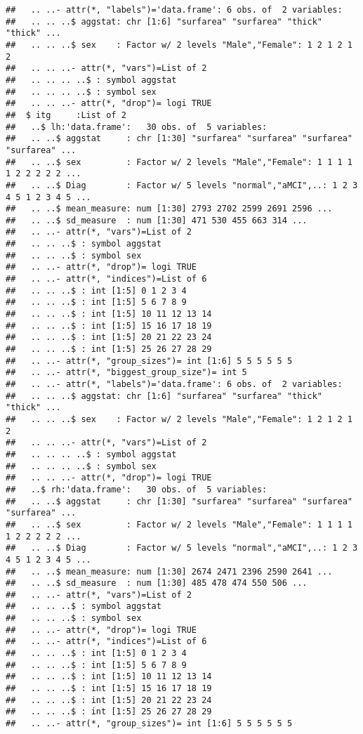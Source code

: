 \documentclass[12pt]{article}\usepackage[]{graphicx}\usepackage[]{color}
\makeatletter
\newenvironment{kframe}{%
 \def\at@end@of@kframe{}%
 \ifinner\ifhmode%
  \def\at@end@of@kframe{\end{minipage}}%
  \begin{minipage}{\columnwidth}%
 \fi\fi%
 \def\FrameCommand##1{\hskip\@totalleftmargin \hskip-\fboxsep
 \colorbox{shadecolor}{##1}\hskip-\fboxsep
     \hskip-\linewidth \hskip-\@totalleftmargin \hskip\columnwidth}%
 \MakeFramed {\advance\hsize-\width
   \@totalleftmargin\z@ \linewidth\hsize
   \@setminipage}}%
 {\par\unskip\endMakeFramed%
 \at@end@of@kframe}
\newenvironment{knitrout}{}{} %
\makeatother
\begin{document}
\begin{knitrout}
\begin{kframe}
\begin{verbatim}
##   .. ..- attr(*, "labels")='data.frame':	6 obs. of  2 variables:
##   .. .. ..$ aggstat: chr [1:6] "surfarea" "surfarea" "thick" "thick" ...
##   .. .. ..$ sex    : Factor w/ 2 levels "Male","Female": 1 2 1 2 1 2
##   .. .. ..- attr(*, "vars")=List of 2
##   .. .. .. ..$ : symbol aggstat
##   .. .. .. ..$ : symbol sex
##   .. .. ..- attr(*, "drop")= logi TRUE
##  $ itg     :List of 2
##   ..$ lh:'data.frame':	30 obs. of  5 variables:
##   .. ..$ aggstat     : chr [1:30] "surfarea" "surfarea" "surfarea" "surfarea" ...
##   .. ..$ sex         : Factor w/ 2 levels "Male","Female": 1 1 1 1 1 2 2 2 2 2 ...
##   .. ..$ Diag        : Factor w/ 5 levels "normal","aMCI",..: 1 2 3 4 5 1 2 3 4 5 ...
##   .. ..$ mean_measure: num [1:30] 2793 2702 2599 2691 2596 ...
##   .. ..$ sd_measure  : num [1:30] 471 530 455 663 314 ...
##   .. ..- attr(*, "vars")=List of 2
##   .. .. ..$ : symbol aggstat
##   .. .. ..$ : symbol sex
##   .. ..- attr(*, "drop")= logi TRUE
##   .. ..- attr(*, "indices")=List of 6
##   .. .. ..$ : int [1:5] 0 1 2 3 4
##   .. .. ..$ : int [1:5] 5 6 7 8 9
##   .. .. ..$ : int [1:5] 10 11 12 13 14
##   .. .. ..$ : int [1:5] 15 16 17 18 19
##   .. .. ..$ : int [1:5] 20 21 22 23 24
##   .. .. ..$ : int [1:5] 25 26 27 28 29
##   .. ..- attr(*, "group_sizes")= int [1:6] 5 5 5 5 5 5
##   .. ..- attr(*, "biggest_group_size")= int 5
##   .. ..- attr(*, "labels")='data.frame':	6 obs. of  2 variables:
##   .. .. ..$ aggstat: chr [1:6] "surfarea" "surfarea" "thick" "thick" ...
##   .. .. ..$ sex    : Factor w/ 2 levels "Male","Female": 1 2 1 2 1 2
##   .. .. ..- attr(*, "vars")=List of 2
##   .. .. .. ..$ : symbol aggstat
##   .. .. .. ..$ : symbol sex
##   .. .. ..- attr(*, "drop")= logi TRUE
##   ..$ rh:'data.frame':	30 obs. of  5 variables:
##   .. ..$ aggstat     : chr [1:30] "surfarea" "surfarea" "surfarea" "surfarea" ...
##   .. ..$ sex         : Factor w/ 2 levels "Male","Female": 1 1 1 1 1 2 2 2 2 2 ...
##   .. ..$ Diag        : Factor w/ 5 levels "normal","aMCI",..: 1 2 3 4 5 1 2 3 4 5 ...
##   .. ..$ mean_measure: num [1:30] 2674 2471 2396 2590 2641 ...
##   .. ..$ sd_measure  : num [1:30] 485 478 474 550 506 ...
##   .. ..- attr(*, "vars")=List of 2
##   .. .. ..$ : symbol aggstat
##   .. .. ..$ : symbol sex
##   .. ..- attr(*, "drop")= logi TRUE
##   .. ..- attr(*, "indices")=List of 6
##   .. .. ..$ : int [1:5] 0 1 2 3 4
##   .. .. ..$ : int [1:5] 5 6 7 8 9
##   .. .. ..$ : int [1:5] 10 11 12 13 14
##   .. .. ..$ : int [1:5] 15 16 17 18 19
##   .. .. ..$ : int [1:5] 20 21 22 23 24
##   .. .. ..$ : int [1:5] 25 26 27 28 29
##   .. ..- attr(*, "group_sizes")= int [1:6] 5 5 5 5 5 5

\end{verbatim}
\end{kframe}
\end{knitrout}
\end{document}
